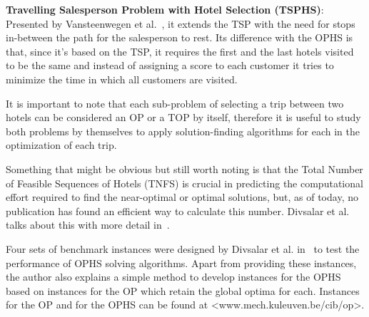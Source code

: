 \textbf{Travelling Salesperson Problem with Hotel Selection (TSPHS)}: Presented by Vansteenwegen et al.~\cite{vansteenwegen2012}, it extends the TSP with the need for stops in-between the path for the salesperson to rest. Its difference with the OPHS is that, since it's based on the TSP, it requires the first and the last hotels visited to be the same and instead of assigning a score to each customer it tries to minimize the time in which all customers are visited.

It is important to note that each sub-problem of selecting a trip between two hotels can be considered an OP or a TOP by itself, therefore it is useful to study both problems by themselves to apply solution-finding algorithms for each in the optimization of each trip.

Something that might be obvious but still worth noting is that the Total Number of Feasible Sequences of Hotels (TNFS) is crucial in predicting the computational effort required to find the near-optimal or optimal solutions, but, as of today, no publication has found an efficient way to calculate this number. Divsalar et al. talks about this with more detail in~\cite{divsalar2014}.

Four sets of benchmark instances were designed by Divsalar et al. in~\cite{divsalar2013} to test the performance of OPHS solving algorithms. Apart from providing these instances, the author also explains a simple method to develop instances for the OPHS based on instances for the OP which retain the global optima for each. Instances for the OP and for the OPHS can be found at \textless www.mech.kuleuven.be/cib/op\textgreater.